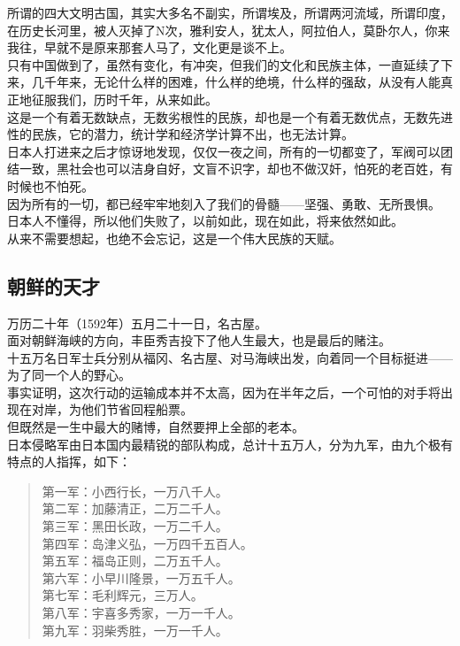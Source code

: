 \begin{multicols}{\theparacolNo}
所谓的四大文明古国，其实大多名不副实，所谓埃及，所谓两河流域，所谓印度，在历史长河里，被人灭掉了N次，雅利安人，犹太人，阿拉伯人，莫卧尔人，你来我往，早就不是原来那套人马了，文化更是谈不上。\\

只有中国做到了，虽然有变化，有冲突，但我们的文化和民族主体，一直延续了下来，几千年来，无论什么样的困难，什么样的绝境，什么样的强敌，从没有人能真正地征服我们，历时千年，从来如此。\\

这是一个有着无数缺点，无数劣根性的民族，却也是一个有着无数优点，无数先进性的民族，它的潜力，统计学和经济学计算不出，也无法计算。\\

日本人打进来之后才惊讶地发现，仅仅一夜之间，所有的一切都变了，军阀可以团结一致，黑社会也可以洁身自好，文盲不识字，却也不做汉奸，怕死的老百姓，有时候也不怕死。\\

因为所有的一切，都已经牢牢地刻入了我们的骨髓——坚强、勇敢、无所畏惧。\\

日本人不懂得，所以他们失败了，以前如此，现在如此，将来依然如此。\\

从来不需要想起，也绝不会忘记，这是一个伟大民族的天赋。\\

\subsection{朝鲜的天才}
万历二十年（1592年）五月二十一日，名古屋。\\

面对朝鲜海峡的方向，丰臣秀吉投下了他人生最大，也是最后的赌注。\\

十五万名日军士兵分别从福冈、名古屋、对马海峡出发，向着同一个目标挺进——为了同一个人的野心。\\

事实证明，这次行动的运输成本并不太高，因为在半年之后，一个可怕的对手将出现在对岸，为他们节省回程船票。\\

但既然是一生中最大的赌博，自然要押上全部的老本。\\

日本侵略军由日本国内最精锐的部队构成，总计十五万人，分为九军，由九个极有特点的人指挥，如下：\\
{\footnotesize \begin{quote}
	第一军：小西行长，一万八千人。\\
	第二军：加藤清正，二万二千人。\\
	第三军：黑田长政，一万二千人。\\
	第四军：岛津义弘，一万四千五百人。\\
	第五军：福岛正则，二万五千人。\\
	第六军：小早川隆景，一万五千人。\\
	第七军：毛利辉元，三万人。\\
	第八军：宇喜多秀家，一万一千人。\\
	第九军：羽柴秀胜，一万一千人。\\
\end{quote}}


\end{multicols}
